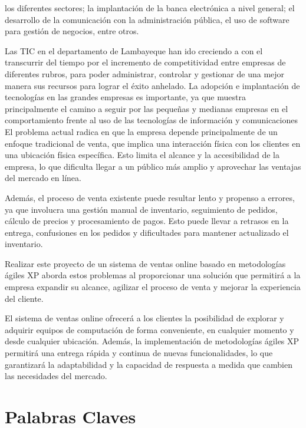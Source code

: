 \documentclass[12pt,a4paper]{article}
\newcommand{\espacio}{\par\vspace{3mm}}
\newcommand{\newsection}[1]{\section{\hspace{4mm} #1}}%
\newcommand{\empresa}{Pantera Digital World S.A.C. }
\newcommand{\titulo}{"Propuesta de implementación de un Sistema de Comercio Electrónico Para la Venta de Equipos y Accesorios de Cómputo" }
\begin{document}
\espacio los diferentes sectores; la implantación de la banca electrónica a nivel general; el desarrollo de la comunicación con la administración pública, el uso de software para gestión de negocios, entre otros.
\espacio Las TIC en el departamento de Lambayeque han ido creciendo a con el transcurrir del tiempo por el incremento de competitividad entre empresas de diferentes rubros, para poder administrar, controlar y gestionar de una mejor manera sus recursos para lograr el éxito anhelado. La adopción e implantación de tecnologías en las grandes empresas es importante, ya que muestra principalmente el camino a seguir por las pequeñas y medianas empresas en el comportamiento frente al uso de las tecnologías de información y comunicaciones
El problema actual radica en que la empresa depende principalmente de un enfoque tradicional de venta, que implica una interacción física con los clientes en una ubicación física específica. Esto limita el alcance y la accesibilidad de la empresa, lo que dificulta llegar a un público más amplio y aprovechar las ventajas del mercado en línea.
\espacio
Además, el proceso de venta existente puede resultar lento y propenso a errores, ya que involucra una gestión manual de inventario, seguimiento de pedidos, cálculo de precios y procesamiento de pagos. Esto puede llevar a retrasos en la entrega, confusiones en los pedidos y dificultades para mantener actualizado el inventario.
\espacio
Realizar este proyecto de un sistema de ventas online basado en metodologías ágiles XP aborda estos problemas al proporcionar una solución que permitirá a la empresa expandir su alcance, agilizar el proceso de venta y mejorar la experiencia del cliente.
\espacio
El sistema de ventas online ofrecerá a los clientes la posibilidad de explorar y adquirir equipos de computación de forma conveniente, en cualquier momento y desde cualquier ubicación. Además, la implementación de metodologías ágiles XP permitirá una entrega rápida y continua de nuevas funcionalidades, lo que garantizará la adaptabilidad y la capacidad de respuesta a medida que cambien las necesidades del mercado.
\newpage
\newsection{Palabras Claves}
\end{document}

